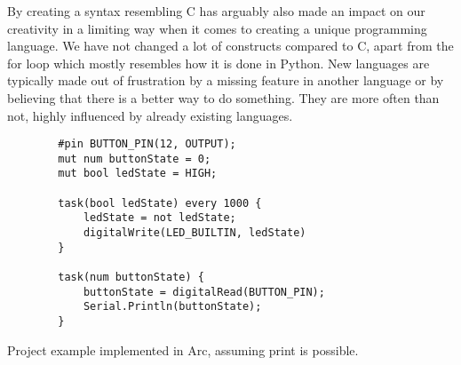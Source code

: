By creating a syntax resembling C has arguably also made an impact on our creativity  in a limiting way when it comes to creating a unique programming language. We have not changed a lot of constructs compared to C, apart from the for loop which mostly resembles how it is done in Python. New languages are typically made out of frustration by a missing feature in another language or by believing that there is a better way to do something. They are more often than not, highly influenced by already existing languages.


\begin{listing}[htb!]
    \begin{verbatim}
        #pin BUTTON_PIN(12, OUTPUT);
        mut num buttonState = 0;
        mut bool ledState = HIGH;

        task(bool ledState) every 1000 {
            ledState = not ledState;
            digitalWrite(LED_BUILTIN, ledState)
        }

        task(num buttonState) {
            buttonState = digitalRead(BUTTON_PIN);
            Serial.Println(buttonState);
        }
    \end{verbatim}
    \caption{Project example implemented in Arc, assuming print is possible.}
    \label{lst:arcexample}
\end{listing}